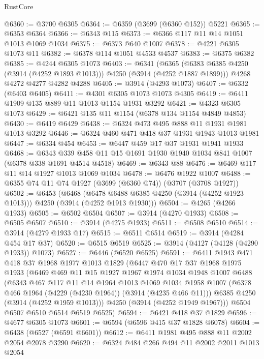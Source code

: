 \begin{lexlean}{RustCore}
\begin{coremodule}
@6360 := @3700 @6305
@6364 := @6359 (@3699 (@6360 @152)) @5221
@6365 := @6353 @6364
@6366 := @6343 @115
@6373 := @6366 @117 @11 @14 @1051 @1013 @1069 @1034
@6375 := @6373 @640 @1007
@6378 := @4221 @6305 @1073 @11
@6382 := @6378 @114 @1051 @4533 @4537
@6383 := @6375 @6382
@6385 := @4244 @6305 @1073
@6403 := @6341
    (@6365 (@6383 @6385 @4250 (@3914 (@4252 @1893 @1013))) @4250 (@3914 (@4252 @1887 @1899)))
    @4268
    @4272
    @4277
    @4282
    @4288
@6405 := @3914 (@4293 @1073)
@6407 := @6332 (@6403 @6405)
@6411 := @4301 @6305 @1073 @1073 @4305
@6419 := @6411 @1909 @135 @889 @11 @1013 @1154 @1931 @3292
@6421 := @4323 @6305 @1073
@6429 := @6421 @135 @11 @1154 (@6378 @134 @1154 @4849 @4853)
@6430 := @6419 @6429
@6438 := @6324 @473 @495 @888 @11 @1931 @1981 @1013 @3292
@6446 := @6324 @460 @471 @418 @37 @1931 @1943 @1013 @1981
@6447 := @6334 @454
@6453 := @6447 @459 @17 @37 @1931 @1941 @1933
@6468 := @6343 @339 @458 @11 @15 @1691 @1930 @1940 @1034 @841 @1007 (@6378 @338 @1691 @4514 @4518)
@6469 := @6343 @88
@6476 := @6469 @117 @11 @14 @1927 @1013 @1069 @1034
@6478 := @6476 @1922 @1007
@6488 := @6355 @74 @11 @74 @1927 (@3699 (@6360 @74)) (@3707 (@3708 @1927))
@6502 := @6453
    (@6468 (@6478 @6488 @6385 @4250 (@3914 (@4252 @1923 @1013))) @4250 (@3914 (@4252 @1913 @1930)))
@6504 := @4265 (@4266 @1933)
@6505 := @6502 @6504
@6507 := @3914 (@4270 @1933)
@6508 := @6505 @6507
@6510 := @3914 (@4275 @1933)
@6511 := @6508 @6510
@6514 := @3914 (@4279 @1933 @17)
@6515 := @6511 @6514
@6519 := @3914 (@4284 @454 @17 @37)
@6520 := @6515 @6519
@6525 := @3914 (@4127 (@4128 (@4290 @1933)) @1073)
@6527 := @6446 (@6520 @6525)
@6591 := @6411
    @1943
    @471
    @418
    @37
    @1968
    @1977
    @1013
    @1829
    (@6447
      @470
      @17
      @37
      @1968
      @1975
      @1933
      (@6469
        @469
        @11
        @15
        @1927
        @1967
        @1974
        @1034
        @1948
        @1007
        @6488
        (@6343
          @467
          @117
          @11
          @14
          @1964
          @1013
          @1069
          @1034
          @1958
          @1007
          (@6378 @466 @1964 (@4229 (@4230 @1964)) (@3914 (@4235 @466 @11)))
          @6385
          @4250
          (@3914 (@4252 @1959 @1013)))
        @4250
        (@3914 (@4252 @1949 @1967)))
      @6504
      @6507
      @6510
      @6514
      @6519
      @6525)
@6594 := @6421 @418 @37 @1829
@6596 := @4677 @6305 @1073
@6601 := @6594 (@6596 @415 @37 @1828 @6078)
@6604 := @6438 (@6527 (@6591 @6601))
@6612 := @6411 @1981 @495 @888 @11 @2002 @2054 @2078 @3290
@6620 := @6324 @484 @266 @494 @11 @2002 @2011 @1013 @2054

\end{coremodule}
\end{lexlean}
